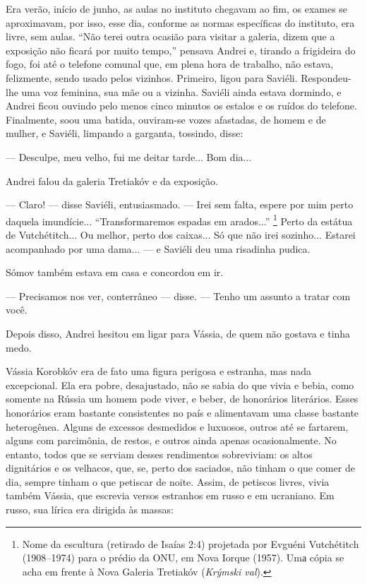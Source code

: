 Era verão, início de junho, as aulas no instituto chegavam ao fim, os
exames se aproximavam, por isso, esse dia, conforme as normas
específicas do instituto, era livre, sem aulas. ``Não terei outra
ocasião para visitar a galeria, dizem que a exposição não ficará por
muito tempo,'' pensava Andrei e, tirando a frigideira do fogo, foi até o
telefone comunal que, em plena hora de trabalho, não estava, felizmente,
sendo usado pelos vizinhos. Primeiro, ligou para Saviéli. Respondeu-lhe
uma voz feminina, sua mãe ou a vizinha. Saviéli ainda estava dormindo, e
Andrei ficou ouvindo pelo menos cinco minutos os estalos e os ruídos do
telefone. Finalmente, soou uma batida, ouviram-se vozes afastadas, de
homem e de mulher, e Saviéli, limpando a garganta, tossindo, disse:

--- Desculpe, meu velho, fui me deitar tarde... Bom dia...

Andrei falou da galeria Tretiakóv e da exposição.

--- Claro! --- disse Saviéli, entusiasmado. --- Irei sem falta, espere
por mim perto daquela imundície... ``Transformaremos espadas em
arados...'' \footnote{Nome da escultura (retirado de Isaías 2:4)
  projetada por Evguéni Vutchétitch (1908\emph{--}1974) para o prédio da
  ONU, em Nova Iorque (1957). Umа cópia se acha em frente à Nova Galeria
  Tretiakóv (\emph{Krýmski val}).} Perto da estátua de Vutchétitch... Ou
melhor, perto dos caixas... Só que não irei sozinho... Estarei
acompanhado por uma dama... --- e Saviéli deu uma risadinha pudica.

Sómov também estava em casa e concordou em ir.

--- Precisamos nos ver, conterrâneo --- disse. --- Tenho um assunto a
tratar com você.

Depois disso, Andrei hesitou em ligar para Vássia, de quem não gostava e
tinha medo.

Vássia Korobkóv era de fato uma figura perigosa e estranha, mas nada
excepcional. Ela era pobre, desajustado, não se sabia do que vivia e
bebia, como somente na Rússia um homem pode viver, e beber, de
honorários literários. Esses honorários eram bastante consistentes no
país e alimentavam uma classe bastante heterogênea. Alguns de excessos
desmedidos e luxuosos, outros até se fartarem, alguns com parcimônia, de
restos, e outros ainda apenas ocasionalmente. No entanto, todos que se
serviam desses rendimentos sobreviviam: os altos dignitários e os
velhacos, que, se, perto dos saciados, não tinham o que comer de dia,
sempre tinham o que petiscar de noite. Assim, de petiscos livres, vivia
também Vássia, que escrevia versos estranhos em russo e em ucraniano. Em
russo, sua lírica era dirigida às massas:

